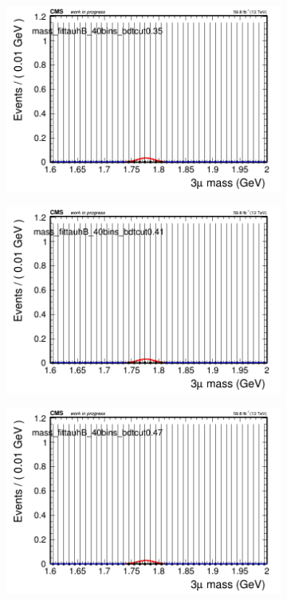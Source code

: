 \begin{figure}[H]
\begin{subfigure}{0.2\textwidth}
        \caption{}
    \end{subfigure}
    \begin{subfigure}{0.2\textwidth}
        \includegraphics[width=\textwidth]{flat_fit/plots/tauhB/massfit_tauhB_40bins_bdtcut0.35.png}
        \caption{}
    \end{subfigure}
    \begin{subfigure}{0.2\textwidth}
        \includegraphics[width=\textwidth]{flat_fit/plots/tauhB/massfit_tauhB_40bins_bdtcut0.41.png}
        \caption{}
    \end{subfigure}
    \begin{subfigure}{0.2\textwidth}
        \includegraphics[width=\textwidth]{flat_fit/plots/tauhB/massfit_tauhB_40bins_bdtcut0.47.png}

\end{subfigure}
\end{figure}
